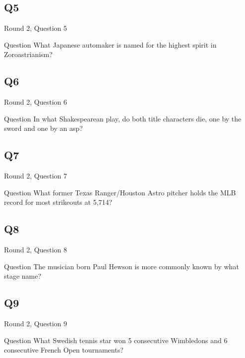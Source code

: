 \documentclass[11pt]{beamer}
\begin{document}
\subsection*{Q5}
\begin{frame}[t]{Round 2, Question 5}
\vspace{2em}
\begin{block}{Question}
What Japanese automaker is named for the highest spirit in Zoroastrianism\@?
\end{block}
\end{frame}
    

\subsection*{Q6}
\begin{frame}[t]{Round 2, Question 6}
\vspace{2em}
\begin{block}{Question}
In what Shakespearean play, do both title characters die, one by the sword and one by an asp\@?
\end{block}
\end{frame}
    

\subsection*{Q7}
\begin{frame}[t]{Round 2, Question 7}
\vspace{2em}
\begin{block}{Question}
What former Texas Ranger/Houston Astro pitcher holds the MLB record for most strikeouts at 5,714\@?
\end{block}
\end{frame}
    

\subsection*{Q8}
\begin{frame}[t]{Round 2, Question 8}
\vspace{2em}
\begin{block}{Question}
The musician born Paul Hewson is more commonly known by what stage name\@?
\end{block}
\end{frame}
    

\subsection*{Q9}
\begin{frame}[t]{Round 2, Question 9}
\vspace{2em}
\begin{block}{Question}
What Swedish tennis star won 5 consecutive Wimbledons and 6 consecutive French Open tournaments\@?
\end{block}
\end{frame}
    
\end{document}
